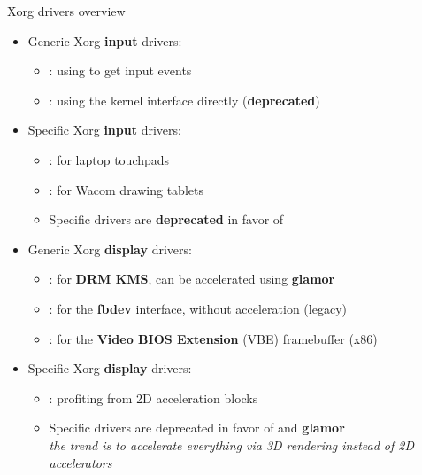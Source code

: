 \begin{frame}{Xorg drivers overview}
  \begin{itemize}
  \item Generic Xorg \textbf{input} drivers:
    \begin{itemize}
    \item {}: using  to get input events
    \item {}: using the  kernel interface directly (\textbf{deprecated})
    \end{itemize}
  \item Specific Xorg \textbf{input} drivers:
    \begin{itemize}
    \item {}: for laptop touchpads
    \item {}: for Wacom drawing tablets
    \item Specific drivers are \textbf{deprecated} in favor of 
    \end{itemize}
  \item Generic Xorg \textbf{display} drivers:
    \begin{itemize}
    \item {}: for \textbf{DRM KMS}, can be accelerated using \textbf{glamor}
    \item {}: for the \textbf{fbdev} interface, without acceleration (legacy)
    \item {}: for the \textbf{Video BIOS Extension} (VBE) framebuffer (x86)
    \end{itemize}
  \item Specific Xorg \textbf{display} drivers:
    \begin{itemize}
    \item {}: profiting from 2D acceleration blocks
    \item Specific drivers are deprecated in favor of  and \textbf{glamor}\\
      \textit{the trend is to accelerate everything via 3D rendering instead of 2D accelerators}
    \end{itemize}
  \end{itemize}
\end{frame}

